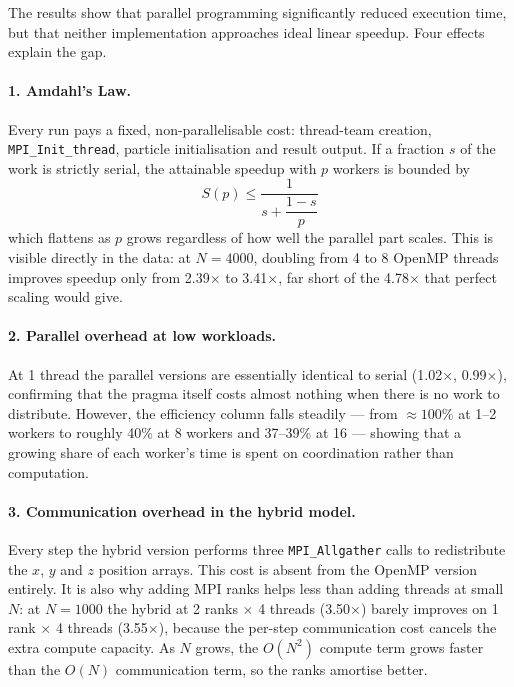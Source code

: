 \documentclass[11pt,a4paper]{article}
\begin{document}
\clearpage

The results show that parallel programming significantly reduced execution
time, but that neither implementation approaches ideal linear speedup. Four
effects explain the gap.

\paragraph{1. Amdahl's Law.}
Every run pays a fixed, non-parallelisable cost: thread-team creation,
\texttt{MPI\_Init\_thread}, particle initialisation and result output. If a
fraction $s$ of the work is strictly serial, the attainable speedup with $p$
workers is bounded by
\begin{equation}
S(p) \leq \frac{1}{s + \dfrac{1-s}{p}}
\end{equation}
which flattens as $p$ grows regardless of how well the parallel part scales.
This is visible directly in the data: at $N=4000$, doubling from 4 to 8 OpenMP
threads improves speedup only from 2.39$\times$ to 3.41$\times$, far short of
the 4.78$\times$ that perfect scaling would give.

\paragraph{2. Parallel overhead at low workloads.}
At 1 thread the parallel versions are essentially identical to serial
(1.02$\times$, 0.99$\times$), confirming that the pragma itself costs almost
nothing when there is no work to distribute. However, the efficiency column
falls steadily --- from $\approx 100\%$ at 1--2 workers to roughly 40\% at 8
workers and 37--39\% at 16 --- showing that a growing share of each worker's
time is spent on coordination rather than computation.

\paragraph{3. Communication overhead in the hybrid model.}
Every step the hybrid version performs three \texttt{MPI\_Allgather} calls to
redistribute the $x$, $y$ and $z$ position arrays. This cost is absent from the
OpenMP version entirely. It is also why adding MPI ranks helps less than adding
threads at small $N$: at $N=1000$ the hybrid at 2 ranks $\times$ 4 threads
(3.50$\times$) barely improves on 1 rank $\times$ 4 threads (3.55$\times$),
because the per-step communication cost cancels the extra compute capacity.
As $N$ grows, the $O(N^2)$ compute term grows faster than the $O(N)$
communication term, so the ranks amortise better.
\end{document}
